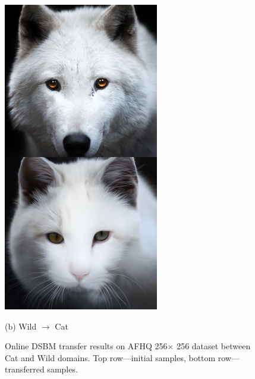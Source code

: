 \documentclass{article}
\begin{document}
\begin{figure}
\begin{minipage}[t]{0.48\textwidth}
\begin{minipage}[t]{0.19\textwidth}
            \includegraphics[width=\linewidth]{img/afhq_main/afhq256_bwd_5.png}
        \end{minipage}
        \caption*{(b) Wild $\rightarrow$ Cat} 
    \end{minipage}
\caption{Online DSBM transfer results on AFHQ 256$\times$ 256 dataset between Cat and Wild domains. Top row---initial samples, bottom row---transferred samples.  } 
\end{figure}
\end{document}
